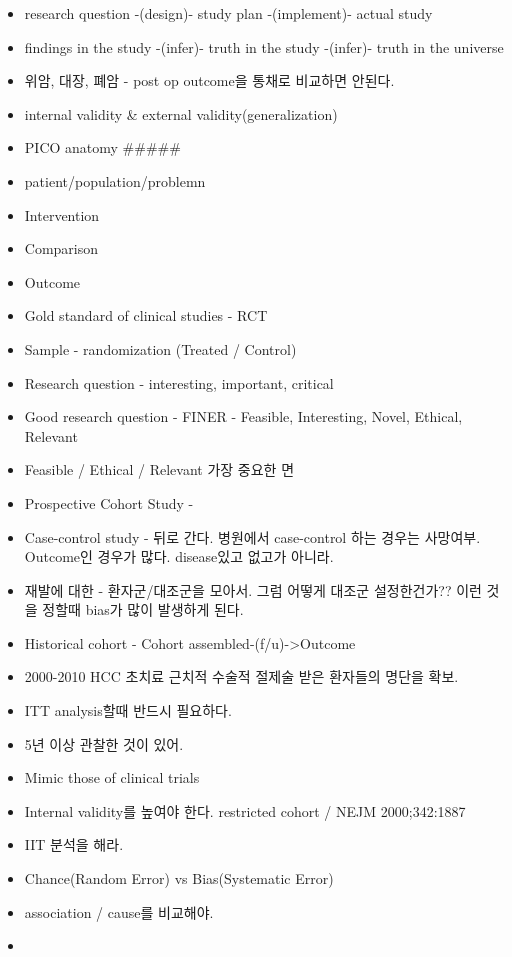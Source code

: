 \documentclass[]{book}
\providecommand{\tightlist}{%
  \setlength{\itemsep}{0pt}\setlength{\parskip}{0pt}}
\begin{document}
\begin{itemize}
\tightlist
\item
  research question -(design)- study plan -(implement)- actual study
\item
  findings in the study -(infer)- truth in the study -(infer)- truth in
  the universe
\item
  위암, 대장, 폐암 - post op outcome을 통채로 비교하면 안된다.
\item
  internal validity \& external validity(generalization)
\item
  PICO anatomy \#\#\#\#\#
\item
  patient/population/problemn
\item
  Intervention
\item
  Comparison
\item
  Outcome
\item
  Gold standard of clinical studies - RCT
\item
  Sample - randomization (Treated / Control)
\item
  Research question - interesting, important, critical
\item
  Good research question - FINER - Feasible, Interesting, Novel,
  Ethical, Relevant
\item
  Feasible / Ethical / Relevant 가장 중요한 면
\item
  Prospective Cohort Study -
\item
  Case-control study - 뒤로 간다. 병원에서 case-control 하는 경우는
  사망여부. Outcome인 경우가 많다. disease있고 없고가 아니라.
\item
  재발에 대한 - 환자군/대조군을 모아서. 그럼 어떻게 대조군 설정한건가??
  이런 것을 정할때 bias가 많이 발생하게 된다.
\item
  Historical cohort - Cohort assembled-(f/u)-\textgreater{}Outcome
\item
  2000-2010 HCC 초치료 근치적 수술적 절제술 받은 환자들의 명단을 확보.
\item
  ITT analysis할때 반드시 필요하다.
\item
  5년 이상 관찰한 것이 있어.
\item
  Mimic those of clinical trials
\item
  Internal validity를 높여야 한다. restricted cohort / NEJM
  2000;342:1887
\item
  IIT 분석을 해라.
\item
  Chance(Random Error) vs Bias(Systematic Error)
\item
  association / cause를 비교해야.
\item

\end{itemize}
\end{document}
